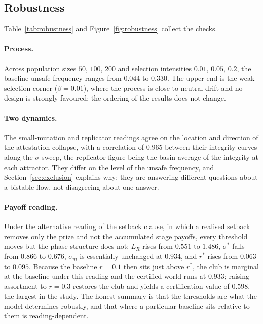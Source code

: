 \documentclass[11pt,a4paper]{article}
\theoremstyle{definition}
\begin{document}
\subsection{Robustness}
\label{sec:robustness}

Table~\ref{tab:robustness} and Figure~\ref{fig:robustness} collect the checks.

\paragraph{Process.} Across population sizes $50$, $100$, $200$ and selection
intensities $0.01$, $0.05$, $0.2$, the baseline unsafe frequency ranges from
$0.044$ to $0.330$. The upper end is the weak-selection corner
($\beta = 0.01$), where the process is close to neutral drift and no design is
strongly favoured; the ordering of the results does not change.

\paragraph{Two dynamics.} The small-mutation and replicator readings agree on
the location and direction of the attestation collapse, with a correlation of
$0.965$ between their integrity curves along the $\sigma$ sweep, the replicator
figure being the basin average of the integrity at each attractor. They differ
on the level of the unsafe frequency, and Section~\ref{sec:exclusion} explains
why: they are answering different questions about a bistable flow, not
disagreeing about one answer.

\paragraph{Payoff reading.} Under the alternative reading of the setback
clause, in which a realised setback removes only the prize and not the
accumulated stage payoffs, every threshold moves but the phase structure does
not: $L_R$ rises from $0.551$ to $1.486$, $\sigma^{*}$ falls from $0.866$ to
$0.676$, $\sigma_m$ is essentially unchanged at $0.934$, and $r^{*}$ rises from
$0.063$ to $0.095$. Because the baseline $r = 0.1$ then sits just above
$r^{*}$, the club is marginal at the baseline under this reading and the
certified world runs at $0.933$; raising assortment to $r = 0.3$ restores the
club and yields a certification value of $0.598$, the largest in the study. The
honest summary is that the thresholds are what the model determines robustly,
and that where a particular baseline sits relative to them is reading-dependent.
\end{document}
